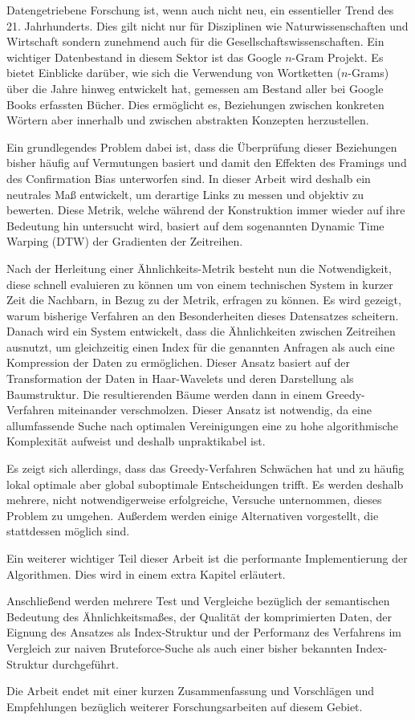 \Abstract{}

Datengetriebene Forschung ist, wenn auch nicht neu, ein essentieller Trend des 21. Jahrhunderts. Dies gilt nicht nur für Disziplinen wie Naturwissenschaften und Wirtschaft sondern zunehmend auch für die Gesellschaftswissenschaften. Ein wichtiger Datenbestand in diesem Sektor ist das Google $n$-Gram Projekt. Es bietet Einblicke darüber, wie sich die Verwendung von Wortketten ($n$-Grams) über die Jahre hinweg entwickelt hat, gemessen am Bestand aller bei Google Books erfassten Bücher. Dies ermöglicht es, Beziehungen zwischen konkreten Wörtern aber innerhalb und zwischen abstrakten Konzepten herzustellen.

Ein grundlegendes Problem dabei ist, dass die Überprüfung dieser Beziehungen bisher häufig auf Vermutungen basiert und damit den Effekten des Framings und des Confirmation Bias unterworfen sind. In dieser Arbeit wird deshalb ein neutrales Maß entwickelt, um derartige Links zu messen und objektiv zu bewerten. Diese Metrik, welche während der Konstruktion immer wieder auf ihre Bedeutung hin untersucht wird, basiert auf dem sogenannten Dynamic Time Warping (DTW) der Gradienten der Zeitreihen.

Nach der Herleitung einer Ähnlichkeits-Metrik besteht nun die Notwendigkeit, diese schnell evaluieren zu können um von einem technischen System in kurzer Zeit die Nachbarn, in Bezug zu der Metrik, erfragen zu können. Es wird gezeigt, warum bisherige Verfahren an den Besonderheiten dieses Datensatzes scheitern. Danach wird ein System entwickelt, dass die Ähnlichkeiten zwischen Zeitreihen ausnutzt, um gleichzeitig einen Index für die genannten Anfragen als auch eine Kompression der Daten zu ermöglichen. Dieser Ansatz basiert auf der Transformation der Daten in Haar-Wavelets und deren Darstellung als Baumstruktur. Die resultierenden Bäume werden dann in einem Greedy-Verfahren miteinander verschmolzen. Dieser Ansatz ist notwendig, da eine allumfassende Suche nach optimalen Vereinigungen eine zu hohe algorithmische Komplexität aufweist und deshalb unpraktikabel ist.

Es zeigt sich allerdings, dass das Greedy-Verfahren Schwächen hat und zu häufig lokal optimale aber global suboptimale Entscheidungen trifft. Es werden deshalb mehrere, nicht notwendigerweise erfolgreiche, Versuche unternommen, dieses Problem zu umgehen. Außerdem werden einige Alternativen vorgestellt, die stattdessen möglich sind.

Ein weiterer wichtiger Teil dieser Arbeit ist die performante Implementierung der Algorithmen. Dies wird in einem extra Kapitel erläutert.

Anschließend werden mehrere Test und Vergleiche bezüglich der semantischen Bedeutung des Ähnlichkeitsmaßes, der Qualität der komprimierten Daten, der Eignung des Ansatzes als Index-Struktur und der Performanz des Verfahrens im Vergleich zur naiven Bruteforce-Suche als auch einer bisher bekannten Index-Struktur durchgeführt.

Die Arbeit endet mit einer kurzen Zusammenfassung und Vorschlägen und Empfehlungen bezüglich weiterer Forschungsarbeiten auf diesem Gebiet.
